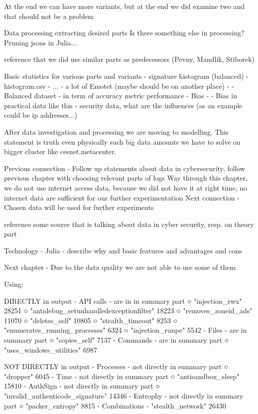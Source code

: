 At the end we can have more variants, but at the end we did examine two and that should not be a problem

Data processing
extracting desired parts
Is there something else in processing?
Pruning jsons in Julia...


reference that we did use similar parts as predecessors (Pevny, Mandlik, Stiborek)

Basic statistics for various parts and variants
  - signature histogram (balanced) - histogram.csv
  - ...
  - a lot of Emotet (maybe should be on another place)
  - - Balanced dataset - in term of accuracy metric performance
  - Bias - - Bias in practical data like this - security data, what are the influences (as an example could be ip addresses...)


After data investigation and processing we are moving to modelling. This statement is truth even physically such big data amounts we have to solve on bigger cluster like cesnet.metacenter.

Previous connection
- Follow up statements about data in cybersecurity, follow previous chapter with choosing relevant parts of logs
Way through this chapter, we do not use internet access data, because we did not have it at right time, no internet data are sufficient for our further experimentation
Next connection
- Chosen data will be used for further experiments


reference some source that is talking about data in cyber security, resp. on theory part
  
Technology - Julia
  - describe why and basic features and advantages and cons



Next chapter - Due to the data quality we are not able to use some of them

Using:

DIRECTLY in output
	- API calls - are in in summary part
		○ "injection_rwx" 28251
		○ "antidebug_setunhandledexceptionfilter" 18223
		○ "removes_zoneid_ads" 11070
		○ "deletes_self" 10805
		○ "stealth_timeout" 8253
		○ "enumerates_running_processes" 6324
		○ "injection_runpe"  5542
  - Files - are in summary part
		○ "copies_self" 7137
	- Commands - are in summary part
		○ "uses_windows_utilities" 6987

NOT DIRECTLY in output
	- Processes - not directly in summary part
		○ "dropper"  6045
	- Time - not directly in summary part
		○ "antisandbox_sleep" 15810
	- AuthSign - not directly in summary part
		○ "invalid_authenticode_signature" 14346
	- Entrophy - not directly in summary part
		○ "packer_entropy" 8815
	- Combinations - 
    "stealth_network" 26430
